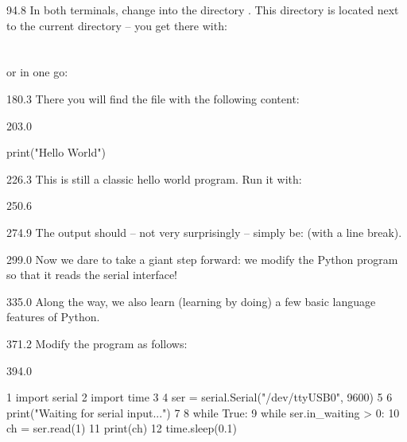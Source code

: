 \documentclass{aslab}
\makeatletter
\newcommand*\aN[1]{\textcolor{codeorange}{#1}}%
\newcommand*\aK[1]{\textcolor{codered}{#1}}%
\newcommand*\aR[1]{\textcolor{codecyan}{#1}}%
\newcommand*\aM[1]{\textcolor{codemagenta}{#1}}%
\newenvironment{asmlisting}[1][11]{\par
  \edef\asm@bs{\the\baselineskip}\fontsize{#1bp}{\asm@bs}\selectfont
  \ttfamily\asm@setup}{\par}
\makeatother
\begin{document}
\begin{region}[pitch=12.24]{94.8}
In both terminals, change into the directory . This directory
is located next to the current directory  -- you get there
with:\\
\\
\\
or in one go:\\
\end{region}

\begin{region}{180.3}
There you will find the file  with the following
content:
\end{region}

\begin{region}{203.0}
\begin{asmlisting}[9]
\aR{print}(\aK{"Hello World"})
\end{asmlisting}
\end{region}

\begin{region}{226.3}
This is still a classic hello world program. Run it with:
\end{region}

\begin{region}{250.6}
\end{region}

\begin{region}{274.9}
The output should -- not very surprisingly -- simply be: 
(with a line break).
\end{region}

\begin{region}{299.0}
Now we dare to take a giant step forward: we modify the Python program so
that it reads the serial interface!
\end{region}

\begin{region}{335.0}
Along the way, we also learn (learning by doing) a few basic language
features of Python.
\end{region}

\begin{region}{371.2}
Modify the program  as follows:
\end{region}

\begin{region}[pitch=10]{394.0}
\begin{asmlisting}[9]
  \aN{1} \aM{import} serial
  \aN{2} \aM{import} time
  \aN{3}
  \aN{4} ser = serial.Serial(\aK{"/dev/ttyUSB0"}, \aK{9600})
  \aN{5}
  \aN{6} \aR{print}(\aK{"Waiting for serial input..."})
  \aN{7}
  \aN{8 while} \aR{True}:
  \aN{9}     \aN{while} ser.in\_waiting > \aK{0}:
 \aN{10}         ch = ser.read(\aK{1})
 \aN{11}         \aR{print}(ch)
 \aN{12}     time.sleep(\aK{0.1})
\end{asmlisting}
\end{region}
\end{document}
